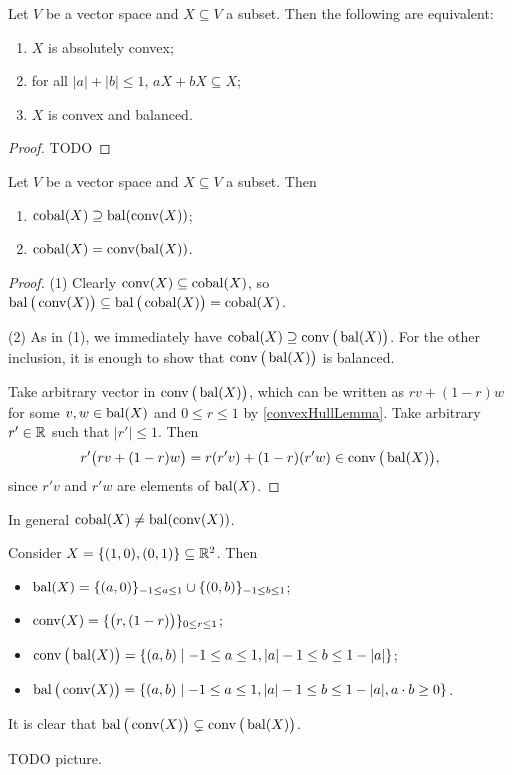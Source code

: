 \begin{lemma} \label{absolutelyConvexCriteria}
Let $V$ be a vector space and $X\subseteq V$ a subset. Then the following are equivalent:
\begin{enumerate}
\item $X$ is absolutely convex;
\item for all $|a|+|b| \leq 1$, $aX +bX \subseteq X$;
\item $X$ is convex and balanced.
\end{enumerate}
\end{lemma}
\begin{proof}
TODO
\end{proof}

\begin{lemma} \label{diskedIsCoBal}
Let $V$ be a vector space and $X\subseteq V$ a subset. Then
\begin{enumerate}
\item $\operatorname{cobal}(X) \supseteq \operatorname{bal}(\operatorname{conv}(X))$;
\item $\operatorname{cobal}(X) = \operatorname{conv}(\operatorname{bal}(X))$.
\end{enumerate}
\end{lemma}
\begin{proof}
(1) Clearly $\operatorname{conv}(X) \subseteq \operatorname{cobal}(X)$, so $\operatorname{bal}\big(\operatorname{conv}(X)\big) \subseteq \operatorname{bal}\big(\operatorname{cobal}(X)\big) = \operatorname{cobal}(X)$.

(2) As in (1), we immediately have $\operatorname{cobal}(X) \supseteq \operatorname{conv}\big(\operatorname{bal}(X)\big)$. For the other inclusion, it is enough to show that $\operatorname{conv}\big(\operatorname{bal}(X)\big)$ is balanced.

Take arbitrary vector in $\operatorname{conv}\big(\operatorname{bal}(X)\big)$, which can be written as $rv + (1-r)w$ for some $v,w\in \operatorname{bal}(X)$ and $0\leq r\leq 1$ by \ref{convexHullLemma}. Take arbitrary $r'\in \mathbb{R}$ such that $|r'|\leq 1$. Then
\[ r'\big(rv + (1-r)w\big) = r(r'v) + (1-r)(r'w) \in \operatorname{conv}\big(\operatorname{bal}(X)\big), \]
since $r'v$ and $r'w$ are elements of $\operatorname{bal}(X)$.
\end{proof}

\begin{example}
In general $\operatorname{cobal}(X) \neq \operatorname{bal}(\operatorname{conv}(X))$.

Consider $X= \{(1,0), (0,1)\}\subseteq \mathbb{R}^2$. Then
\begin{itemize}
\item $\operatorname{bal}(X) = \{(a,0)\}_{-1\leq a\leq 1} \cup \{(0,b)\}_{-1\leq b\leq 1}$;
\item $\operatorname{conv}(X) = \{\big(r,(1-r)\big)\}_{0\leq r\leq 1}$;
\item $\convex\big(\balanced(X)\big) = \setbuilder{(a,b)}{-1\leq a\leq 1, |a|-1 \leq b\leq 1-|a|}$;
\item $\balanced\big(\convex(X)\big) = \setbuilder{(a,b)}{-1\leq a\leq 1, |a|-1 \leq b\leq 1-|a|, a\cdot b\geq 0}$.
\end{itemize}
It is clear that $\operatorname{bal}\big(\operatorname{conv}(X)\big) \subsetneq \operatorname{conv}\big(\operatorname{bal}(X)\big)$.

TODO picture.
\end{example}

